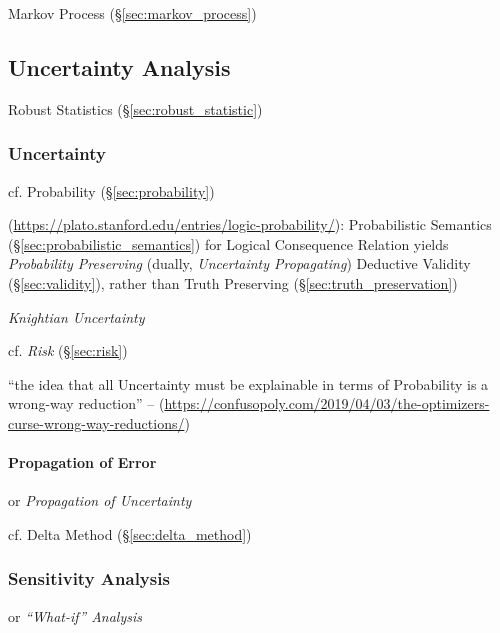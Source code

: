 Markov Process (\S\ref{sec:markov_process})



\subsection{Uncertainty Analysis}\label{sec:uncertainty_analysis}

\fist Robust Statistics (\S\ref{sec:robust_statistic})



\subsubsection{Uncertainty}\label{sec:uncertainty}

cf. Probability (\S\ref{sec:probability})

(\url{https://plato.stanford.edu/entries/logic-probability/}): Probabilistic
Semantics (\S\ref{sec:probabilistic_semantics}) for Logical Consequence Relation
yields \emph{Probability Preserving} (dually, \emph{Uncertainty Propagating})
Deductive Validity (\S\ref{sec:validity}), rather than Truth Preserving
(\S\ref{sec:truth_preservation})

\emph{Knightian Uncertainty}

cf. \emph{Risk} (\S\ref{sec:risk})

``the idea that all Uncertainty must be explainable in terms of Probability is a
wrong-way reduction'' --
(\url{https://confusopoly.com/2019/04/03/the-optimizers-curse-wrong-way-reductions/})



\paragraph{Propagation of Error}\label{sec:error_propagation}\hfill

or \emph{Propagation of Uncertainty}

\fist cf. Delta Method (\S\ref{sec:delta_method})



\subsubsection{Sensitivity Analysis}\label{sec:sensitivity_analysis}

or \emph{``What-if'' Analysis}

